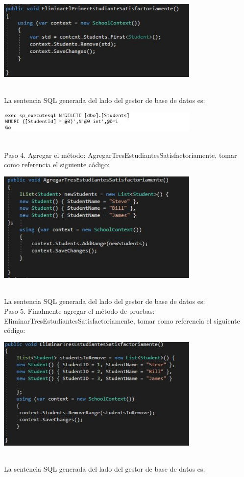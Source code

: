 \begin{center}
	\includegraphics[width=10cm]{./Imagenes/Captura10} 
	\end{center}
\textbf{}\\
La sentencia SQL generada del lado del gestor de base de datos es:
\begin{center}
	\includegraphics[width=10cm]{./Imagenes/U2-2} 
	\end{center}
\textbf{}\\
Paso 4. Agregar el método: AgregarTresEstudiantesSatisfactoriamente, tomar como referencia el siguiente código:

\begin{center}
	\includegraphics[width=10cm]{./Imagenes/Captura11} 
	\end{center}
\textbf{}\\
La sentencia SQL generada del lado del gestor de base de datos es:
\textbf{}\\
Paso 5. Finalmente agregar el método de pruebas: EliminarTresEstudiantesSatisfactoriamente, tomar como
referencia el siguiente código:

\begin{center}
	\includegraphics[width=10cm]{./Imagenes/Captura12} 
	\end{center}
\textbf{}\\
La sentencia SQL generada del lado del gestor de base de datos es:


